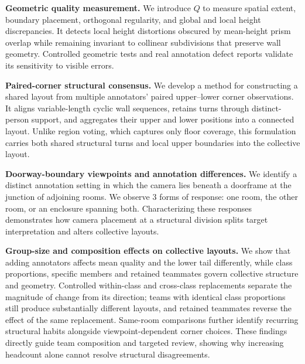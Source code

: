 \textbf{Geometric quality measurement.} We introduce $Q$ to measure spatial extent, boundary placement, orthogonal regularity, and global and local height discrepancies. It detects local height distortions obscured by mean-height prism overlap while remaining invariant to collinear subdivisions that preserve wall geometry. Controlled geometric tests and real annotation defect reports validate its sensitivity to visible errors.

\textbf{Paired-corner structural consensus.} We develop a method for constructing a shared layout from multiple annotators' paired upper--lower corner observations. It aligns variable-length cyclic wall sequences, retains turns through distinct-person support, and aggregates their upper and lower positions into a connected layout. Unlike region voting, which captures only floor coverage, this formulation carries both shared structural turns and local upper boundaries into the collective layout.

\textbf{Doorway-boundary viewpoints and annotation differences.} We identify a distinct annotation setting in which the camera lies beneath a doorframe at the junction of adjoining rooms. We observe 3 forms of response: one room, the other room, or an enclosure spanning both. Characterizing these responses demonstrates how camera placement at a structural division splits target interpretation and alters collective layouts.

\textbf{Group-size and composition effects on collective layouts.} We show that adding annotators affects mean quality and the lower tail differently, while class proportions, specific members and retained teammates govern collective structure and geometry. Controlled within-class and cross-class replacements separate the magnitude of change from its direction; teams with identical class proportions still produce substantially different layouts, and retained teammates reverse the effect of the same replacement. Same-room comparisons further identify recurring structural habits alongside viewpoint-dependent corner choices. These findings directly guide team composition and targeted review, showing why increasing headcount alone cannot resolve structural disagreements.
